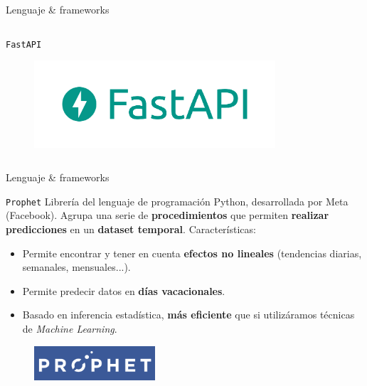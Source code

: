 \documentclass[aspectratio=169,xcolor=dvipsnames]{beamer}
\begin{document}
\begin{frame}{Lenguaje \& frameworks}
\begin{columns}
\begin{column}{0.5\textwidth}
\begin{exampleblock}{\texttt{FastAPI}}
					\begin{figure}[h!]
						\begin{center}
							\includegraphics[width=0.8\textwidth]{img/fastapi_logo.png}
						\end{center}
					\end{figure}
				\end{exampleblock}
				
				
			\end{column}
		\end{columns}
	\end{frame}

	\begin{frame}{Lenguaje \& frameworks}
		\begin{exampleblock}{\texttt{Prophet}}
			Librería del lenguaje de programación Python, desarrollada por Meta (Facebook). Agrupa una serie de \textbf{procedimientos} que permiten \textbf{realizar predicciones} en un \textbf{dataset temporal}. Características:
			
			\begin{itemize}
				\item Permite encontrar y tener en cuenta \textbf{efectos no lineales} (tendencias diarias, semanales, mensuales...).
				\item Permite predecir datos en \textbf{días vacacionales}.
				\item Basado en inferencia estadística, \textbf{más eficiente} que si utilizáramos técnicas de \textit{Machine Learning}.
			\end{itemize}
			
			\begin{figure}[h!]
				\begin{center}
					\includegraphics[width=0.4\textwidth]{img/prophet_logo.png}
				\end{center}
			\end{figure}
		\end{exampleblock}
	\end{frame}
	
\end{document}
